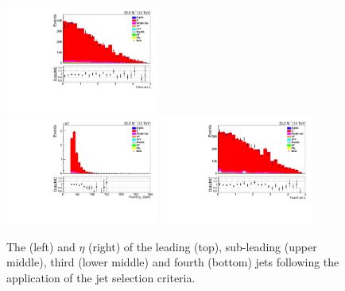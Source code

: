 \begin{figure}[ht]
\includegraphics[width=0.45\textwidth]{figs/background-estimation/plots/unblinded/ttbar_control/thirdJetEta_SingleTop_jetSel_emu.pdf}
\\
\includegraphics[width=0.45\textwidth]{figs/background-estimation/plots/unblinded/ttbar_control/fourthJetPt_SingleTop_jetSel_emu.pdf}
\includegraphics[width=0.45\textwidth]{figs/background-estimation/plots/unblinded/ttbar_control/fourthJetEta_SingleTop_jetSel_emu.pdf}
\caption{
The \pT (left) and $\eta$ (right) of the leading (top), sub-leading (upper middle), third (lower middle) and fourth (bottom) jets following the application of the jet selection criteria.
}
\label{fig:ttbar_jetsKinematics_jetCuts}
\end{figure}

